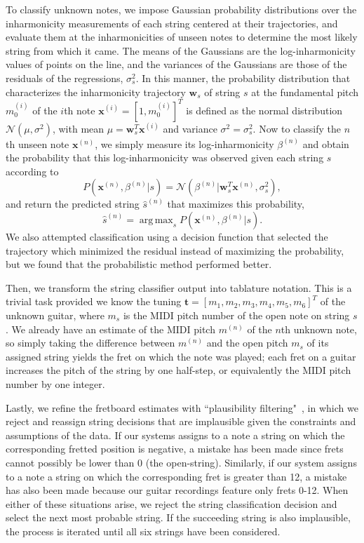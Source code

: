 \documentclass[convention,peer-reviewed]{aesconf}
\DeclareMathOperator*{\argmax}{arg\,max}
\begin{document}
To classify unknown notes, we impose Gaussian probability distributions over the inharmonicity measurements of each string centered at their trajectories, and evaluate them at the inharmonicities of unseen notes to determine the most likely string from which it came. The means of the Gaussians are the log-inharmonicity values of points on the line, and the variances of the Gaussians are those of the residuals of the regressions, $\sigma_s^2$. In this manner, the probability distribution that characterizes the inharmonicity trajectory $\mathbf{w}_s$ of string $s$ at the fundamental pitch $m_0^{(i)}$ of the $i$th note $\mathbf{x}^{(i)} = [1,m_0^{(i)}]^T$ is defined as the normal distribution $\mathcal{N}(\mu, \sigma^2)$, with mean $\mu = \mathbf{w}_s^T\mathbf{x}^{(i)}$ and variance $\sigma^2 = \sigma_s^2$. Now to classify the $n$th unseen note $\mathbf{x}^{(n)}$, we simply measure its log-inharmonicity $\beta^{(n)}$ and obtain the probability that this log-inharmonicity was observed given each string $s$ according to
\begin{equation}
P(\mathbf{x}^{(n)},\beta^{(n)} | s) = \mathcal{N}(\beta^{(n)} | \mathbf{w}_s^T\mathbf{x}^{(n)},\sigma_s^2),
\end{equation}
and return the predicted string $\hat{s}^{(n)}$ that maximizes this probability,
\begin{equation}
\hat{s}^{(n)} = \argmax_{s}P(\mathbf{x}^{(n)},\beta^{(n)} | s).
\label{eq:string-argmax}
\end{equation}
We also attempted classification using a decision function that selected the trajectory which minimized the residual instead of maximizing the probability, but we found that the probabilistic method performed better.

Then, we transform the string classifier output into tablature notation. This is a trivial task provided we know the tuning $\mathbf{t} = [m_1, m_2, m_3, m_4, m_5, m_6]^T$ of the unknown guitar, where $m_s$ is the MIDI pitch number of the open note on string $s$. We already have an estimate of the MIDI pitch $m^{(n)}$ of the $n$th unknown note, so simply taking the difference between $m^{(n)}$ and the open pitch $m_s$ of its assigned string yields the fret on which the note was played; each fret on a guitar increases the pitch of the string by one half-step, or equivalently the MIDI pitch number by one integer.

Lastly, we refine the fretboard estimates with ``plausibility filtering"~\cite{abesser2012}, in which we reject and reassign string decisions that are implausible given the constraints and assumptions of the data. If our systems assigns to a note a string on which the corresponding fretted position is negative, a mistake has been made since frets cannot possibly be lower than 0 (the open-string). Similarly, if our system assigns to a note a string on which the corresponding fret is greater than 12, a mistake has also been made because our guitar recordings feature only frets 0-12. When either of these situations arise, we reject the string classification decision and select the next most probable string. If the succeeding string is also implausible, the process is iterated until all six strings have been considered.
\end{document}
